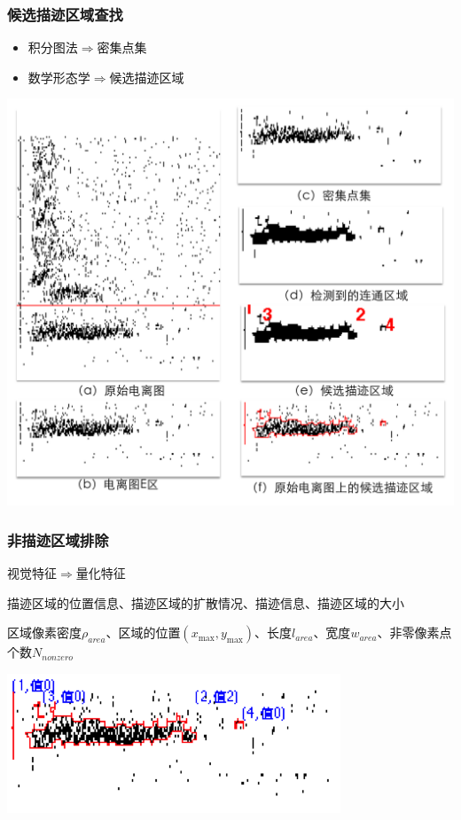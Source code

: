 \documentclass[notheorems,mathserif,table,compress]{beamer}  %
\begin{document}
\begin{frame}
\frametitle{ 候选描迹区域查找}
\begin{tcolorbox}[colback=blue!5,colframe=blue!75!black]
\begin{itemize}
\vspace{-0.5em}
\addtolength{\itemindent}{-2em}
\item 积分图法$\Rightarrow$密集点集
\item 数学形态学$\Rightarrow$候选描迹区域%
\vspace{-1em}
\end{itemize}
\end{tcolorbox}
\centering\includegraphics[width=0.55\linewidth]{检测描迹候选区域.png}
\end{frame}

\begin{frame}
\frametitle{ 非描迹区域排除}
\begin{tcolorbox}[colback=blue!5,colframe=blue!75!black]
\begin{description}
\vspace{-0.5em}
\addtolength{\itemindent}{-2em}
\item[思路] 视觉特征$\Rightarrow$量化特征
\item[视觉特征] 描迹区域的位置信息、描迹区域的扩散情况、描迹信息、描迹区域的大小
\item[量化特征] 区域像素密度$\rho_{area}$、区域的位置$(x_{\max},y_{\max})$、长度$l_{area}$、宽度$w_{area}$、非零像素点个数$N_{nonzero}$
\vspace{-0.5em}
\end{description}
\end{tcolorbox}
\centering\includegraphics[width=0.7\linewidth]{排除结果.png}
\end{frame}
\end{document}
